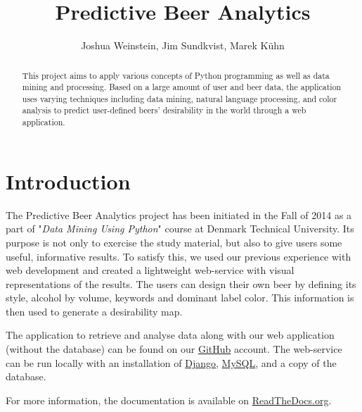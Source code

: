 \documentclass[10pt]{IEEEtran}
\title{Predictive Beer Analytics}
\author{Joshua Weinstein, Jim Sundkvist, Marek Kühn}
\begin{document}
\maketitle

\begin{abstract}
This project aims to apply various concepts of Python programming as well as data mining and processing.
Based on a large amount of user and beer data, the application uses varying techniques including data mining, natural language processing, and color analysis to predict user-defined beers' desirability in the world through a web application. 
\end{abstract}

\section{Introduction}

The Predictive Beer Analytics project has been initiated in the Fall of 2014 as a part of "\textit{Data Mining Using Python}" course at Denmark Technical University. Its purpose is not only to exercise the study material, but also to give users some useful, informative results. To satisfy this, we used our previous experience with web development and created a lightweight web-service with visual representations of the results. The users can design their own beer by defining its style, alcohol by volume, keywords and dominant label color. This information is then used to generate a desirability map.

The application to retrieve and analyse data along with our web application (without the database) can be found on our \href{https://github.com/jweinstein92/Predictive_Beer_Analytics}{GitHub} account. The web-service can be run locally with an installation of \href{https://www.djangoproject.com/}{Django}, \href{http://www.mysql.com/}{MySQL}, and a copy of the database.

For more information, the documentation is available on \href{http://predictive-beer-analytics.readthedocs.org/en/latest/}{ReadTheDocs.org}. 
\end{document}
